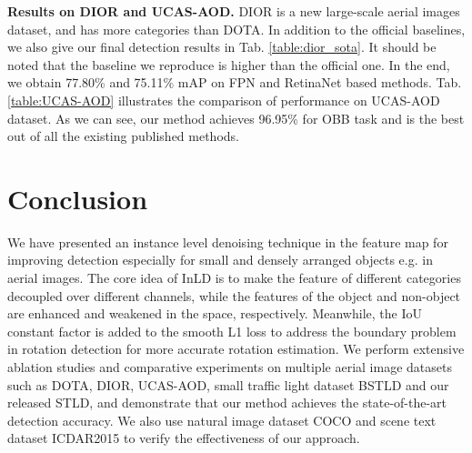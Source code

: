 \documentclass[10pt,journal,compsoc]{IEEEtran}
\begin{document}
\begin{table}[tb!]
	\centering
	\caption{Performance by accuracy (\%) on UCAS-AOD dataset.}
	\label{table:UCAS-AOD}
	\vspace{-5pt}
\end{table}

\textbf{Results on DIOR and UCAS-AOD.}
DIOR is a new large-scale aerial images dataset, and has more categories than DOTA. In addition to the official baselines, we also give our final detection results in Tab. \ref{table:dior_sota}. It should be noted that the baseline we reproduce is higher than the official one. In the end, we obtain 77.80\% and 75.11\% mAP on FPN and RetinaNet based methods. Tab. \ref{table:UCAS-AOD} illustrates the comparison of performance on UCAS-AOD dataset. As we can see, our method achieves 96.95\% for OBB task and is the best out of all the existing published methods.




\section{Conclusion}\label{sec:conclusion}
We have presented an instance level denoising technique in the feature map for improving detection especially for small and densely arranged objects e.g. in aerial images. The core idea of InLD is to make the feature of different categories decoupled over different channels, while the features of the object and non-object are enhanced and weakened in the space, respectively. Meanwhile, the IoU constant factor is added to the smooth L1 loss to address the boundary problem in rotation detection for more accurate rotation estimation. We perform extensive ablation studies and comparative experiments on multiple aerial image datasets such as DOTA, DIOR, UCAS-AOD, small traffic light dataset BSTLD and our released STLD, and demonstrate that our method achieves the state-of-the-art detection accuracy. We also use natural image dataset COCO and scene text dataset ICDAR2015 to verify the effectiveness of our approach. 
\end{document}

